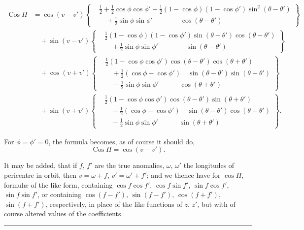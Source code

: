 \documentclass[11pt,a4paper]{article}
\theoremstyle{definition}
\DeclareMathOperator{\Cos}{Cos}
\begin{document}
\begin{align*}
\Cos H &= \cos(v-v') \left\{
\begin{aligned}
&\tfrac12 + \tfrac12\cos\phi\cos\phi'
- \tfrac12(1-\cos\phi)(1-\cos\phi')\sin^2(\theta-\theta') \\
&\quad + \tfrac12\sin\phi\sin\phi' \qquad\qquad \cos(\theta-\theta')
\end{aligned}
\right\} \\
&\quad + \sin(v-v') \left\{
\begin{aligned}
&\tfrac12(1-\cos\phi)(1-\cos\phi')\sin(\theta-\theta')\cos(\theta-\theta') \\
&\quad + \tfrac12\sin\phi\sin\phi' \qquad\qquad \sin(\theta-\theta')
\end{aligned}
\right\} \\
&\quad + \cos(v+v') \left\{
\begin{aligned}
&\tfrac12(1-\cos\phi\cos\phi')\cos(\theta-\theta')\cos(\theta+\theta') \\
&\quad + \tfrac12(\cos\phi-\cos\phi') \quad \sin(\theta-\theta')\sin(\theta+\theta') \\
&\quad - \tfrac12\sin\phi\sin\phi' \qquad\quad \cos(\theta+\theta')
\end{aligned}
\right\} \\
&\quad + \sin(v+v') \left\{
\begin{aligned}
&\tfrac12(1-\cos\phi\cos\phi')\cos(\theta-\theta')\sin(\theta+\theta') \\
&\quad - \tfrac12(\cos\phi-\cos\phi') \quad \sin(\theta-\theta')\cos(\theta+\theta') \\
&\quad - \tfrac12\sin\phi\sin\phi' \qquad\quad \sin(\theta+\theta')
\end{aligned}
\right\}.
\end{align*}

For $\phi=\phi'=0$, the formula becomes, as of course it should do,
\[
\Cos H = \cos(v-v').
\]

It may be added, that if $f$, $f'$ are the true anomalies, $\omega$, $\omega'$ the longitudes of
pericentre in orbit, then $v=\omega+f$, $v'=\omega'+f'$; and we thence have for $\cos H$, formul\ae
of the like form, containing $\cos f\cos f'$, $\cos f\sin f'$, $\sin f\cos f'$, $\sin f\sin f'$, or containing
$\cos(f-f')$, $\sin(f-f')$, $\cos(f+f')$, $\sin(f+f')$, respectively, in place of the like functions
of $z$, $z'$, but with of course altered values of the coefficients.

\hfill\rule{1.5cm}{0.4pt}
\end{document}
